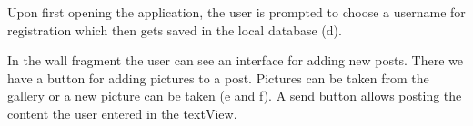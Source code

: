 \documentclass{report}
\begin{document}
\begin{figure}[H]
	\centering
	\hfill
	\hfill
	
\end{figure}

Upon first opening the application, the user is prompted to choose a username for registration which then gets saved in the local database (d).

In the wall fragment the user can see an interface for adding new posts. There we have a button for adding pictures to a post. Pictures can be taken from the gallery or a new picture can be taken (e and f). A send button allows posting the content the user entered in the textView.
\end{document}
